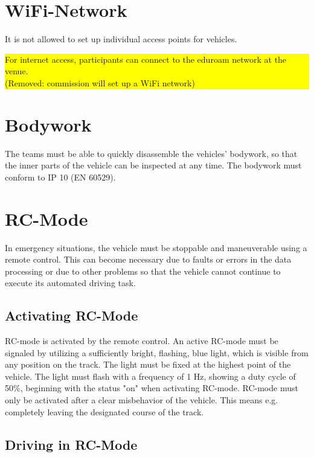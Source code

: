 \documentclass[a4paper]{report}
\newlength\colorboxwidth
\begin{document}
\section{WiFi-Network}

It is not allowed to set up individual access points for vehicles.\\
\colorbox{yellow}{\parbox{\colorboxwidth}{For internet access, participants can connect to the eduroam network at the venue.\\
(Removed: commission will set up a WiFi network)}}

\section{Bodywork}

The teams must be able to quickly disassemble the vehicles’ bodywork, so that the inner parts of the vehicle can be inspected at any time. The bodywork must conform to IP 10 (EN 60529). 

\section{RC-Mode} 
\label{rc_mode}

In emergency situations, the vehicle must be stoppable and maneuverable using a remote control. This can become necessary due to faults or errors in the data processing or due to other problems so that the vehicle cannot continue to execute its automated driving task. 

\subsection{Activating RC-Mode} 

RC-mode is activated by the remote control. An active RC-mode must be signaled by utilizing a sufficiently bright, flashing, blue light, which is visible from any position on the track. The light must be fixed at the highest point of the vehicle. The light must flash with a frequency of 1 Hz, showing a duty cycle of 50\%, beginning with the status "on" when activating RC-mode. RC-mode must only be activated after a clear misbehavior of the vehicle. This means e.g. completely leaving the designated course of the track. 

\subsection{Driving in RC-Mode}
\end{document}
